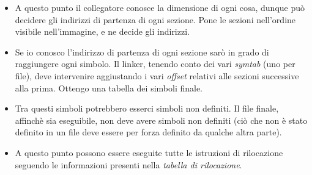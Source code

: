 \documentclass[11pt]{report}
\theoremstyle{definition}
\begin{document}
\begin{itemize}
\item A questo punto il collegatore conosce la dimensione di ogni cosa, dunque può decidere gli indirizzi di partenza di ogni sezione. Pone le sezioni nell'ordine visibile nell'immagine, e ne decide gli indirizzi. 
\item Se io conosco l'indirizzo di partenza di ogni sezione sarò in grado di raggiungere ogni simbolo.  Il linker, tenendo conto dei vari \emph{symtab} (uno per file), deve intervenire aggiustando i vari \emph{offset} relativi alle sezioni successive alla prima. Ottengo una tabella dei simboli finale.
\item Tra questi simboli potrebbero esserci simboli non definiti. Il file finale, affinchè sia eseguibile, non deve avere simboli non definiti (ciò che non è stato definito in un file deve essere per forza definito da qualche altra parte).
\item A questo punto possono essere eseguite tutte le istruzioni di rilocazione seguendo le informazioni presenti nella \emph{tabella di rilocazione}.
\end{itemize}
\end{document}

